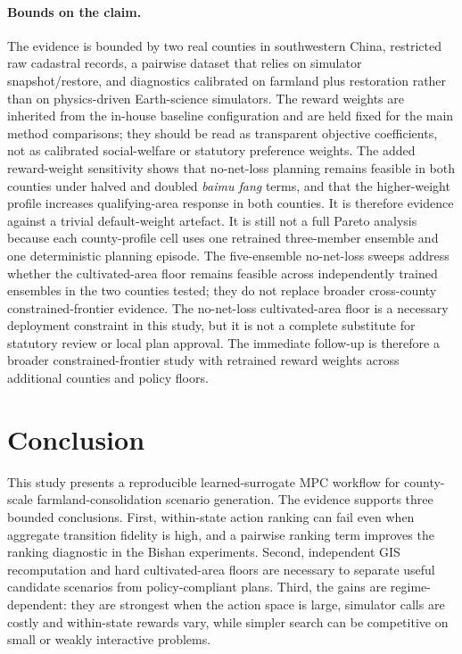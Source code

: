 \documentclass[11pt]{article}
\begin{document}
\paragraph{Bounds on the claim.} The evidence is bounded by two real counties in southwestern China, restricted raw cadastral records, a pairwise dataset that relies on simulator snapshot/restore, and diagnostics calibrated on farmland plus restoration rather than on physics-driven Earth-science simulators. The reward weights are inherited from the in-house baseline configuration and are held fixed for the main method comparisons; they should be read as transparent objective coefficients, not as calibrated social-welfare or statutory preference weights. The added reward-weight sensitivity shows that no-net-loss planning remains feasible in both counties under halved and doubled \textit{baimu fang} terms, and that the higher-weight profile increases qualifying-area response in both counties. It is therefore evidence against a trivial default-weight artefact. It is still not a full Pareto analysis because each county-profile cell uses one retrained three-member ensemble and one deterministic planning episode. The five-ensemble no-net-loss sweeps address whether the cultivated-area floor remains feasible across independently trained ensembles in the two counties tested; they do not replace broader cross-county constrained-frontier evidence. The no-net-loss cultivated-area floor is a necessary deployment constraint in this study, but it is not a complete substitute for statutory review or local plan approval. The immediate follow-up is therefore a broader constrained-frontier study with retrained reward weights across additional counties and policy floors.


\section{Conclusion}\label{sec:conclusion}

This study presents a reproducible learned-surrogate MPC workflow for county-scale farmland-consolidation scenario generation. The evidence supports three bounded conclusions. First, within-state action ranking can fail even when aggregate transition fidelity is high, and a pairwise ranking term improves the ranking diagnostic in the Bishan experiments. Second, independent GIS recomputation and hard cultivated-area floors are necessary to separate useful candidate scenarios from policy-compliant plans. Third, the gains are regime-dependent: they are strongest when the action space is large, simulator calls are costly and within-state rewards vary, while simpler search can be competitive on small or weakly interactive problems.
\end{document}
